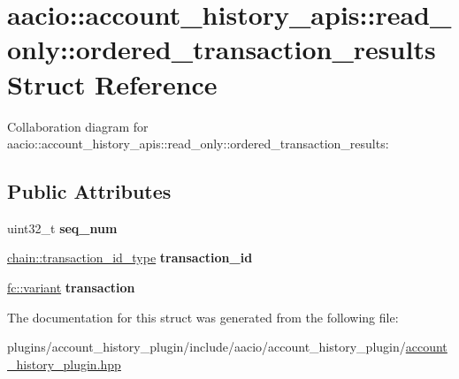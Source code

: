 \hypertarget{structaacio_1_1account__history__apis_1_1read__only_1_1ordered__transaction__results}{}\section{aacio\+:\+:account\+\_\+history\+\_\+apis\+:\+:read\+\_\+only\+:\+:ordered\+\_\+transaction\+\_\+results Struct Reference}
\label{structaacio_1_1account__history__apis_1_1read__only_1_1ordered__transaction__results}


Collaboration diagram for aacio\+:\+:account\+\_\+history\+\_\+apis\+:\+:read\+\_\+only\+:\+:ordered\+\_\+transaction\+\_\+results\+:
\subsection*{Public Attributes}
\begin{DoxyCompactItemize}
\item 
\mbox{\label{structaacio_1_1account__history__apis_1_1read__only_1_1ordered__transaction__results_a10d25f1b37113d7ce64306aa17bc1d6f}} 
uint32\+\_\+t {\bfseries seq\+\_\+num}
\item 
\mbox{\label{structaacio_1_1account__history__apis_1_1read__only_1_1ordered__transaction__results_af04286734204b3f4e5ce9789d0c53fff}} 
\mbox{\hyperlink{classfc_1_1sha256}{chain\+::transaction\+\_\+id\+\_\+type}} {\bfseries transaction\+\_\+id}
\item 
\mbox{\label{structaacio_1_1account__history__apis_1_1read__only_1_1ordered__transaction__results_a76d8df5051deb22e724fe6118d1a29d8}} 
\mbox{\hyperlink{classfc_1_1variant}{fc\+::variant}} {\bfseries transaction}
\end{DoxyCompactItemize}


The documentation for this struct was generated from the following file\+:\begin{DoxyCompactItemize}
\item 
plugins/account\+\_\+history\+\_\+plugin/include/aacio/account\+\_\+history\+\_\+plugin/\mbox{\hyperlink{account__history__plugin_8hpp}{account\+\_\+history\+\_\+plugin.\+hpp}}\end{DoxyCompactItemize}

